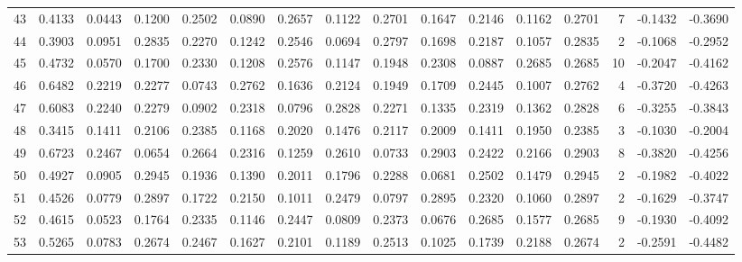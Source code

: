\begin{tabular}{lrrrrrrrrrrrrrrr}
43  &      0.4133 &  0.0443 &  0.1200 &  0.2502 &  0.0890 &  0.2657 &  0.1122 &  0.2701 &  0.1647 &  0.2146 &   0.1162 &     0.2701 &      7 &                   -0.1432 &                    -0.3690 \\
44  &      0.3903 &  0.0951 &  0.2835 &  0.2270 &  0.1242 &  0.2546 &  0.0694 &  0.2797 &  0.1698 &  0.2187 &   0.1057 &     0.2835 &      2 &                   -0.1068 &                    -0.2952 \\
45  &      0.4732 &  0.0570 &  0.1700 &  0.2330 &  0.1208 &  0.2576 &  0.1147 &  0.1948 &  0.2308 &  0.0887 &   0.2685 &     0.2685 &     10 &                   -0.2047 &                    -0.4162 \\
46  &      0.6482 &  0.2219 &  0.2277 &  0.0743 &  0.2762 &  0.1636 &  0.2124 &  0.1949 &  0.1709 &  0.2445 &   0.1007 &     0.2762 &      4 &                   -0.3720 &                    -0.4263 \\
47  &      0.6083 &  0.2240 &  0.2279 &  0.0902 &  0.2318 &  0.0796 &  0.2828 &  0.2271 &  0.1335 &  0.2319 &   0.1362 &     0.2828 &      6 &                   -0.3255 &                    -0.3843 \\
48  &      0.3415 &  0.1411 &  0.2106 &  0.2385 &  0.1168 &  0.2020 &  0.1476 &  0.2117 &  0.2009 &  0.1411 &   0.1950 &     0.2385 &      3 &                   -0.1030 &                    -0.2004 \\
49  &      0.6723 &  0.2467 &  0.0654 &  0.2664 &  0.2316 &  0.1259 &  0.2610 &  0.0733 &  0.2903 &  0.2422 &   0.2166 &     0.2903 &      8 &                   -0.3820 &                    -0.4256 \\
50  &      0.4927 &  0.0905 &  0.2945 &  0.1936 &  0.1390 &  0.2011 &  0.1796 &  0.2288 &  0.0681 &  0.2502 &   0.1479 &     0.2945 &      2 &                   -0.1982 &                    -0.4022 \\
51  &      0.4526 &  0.0779 &  0.2897 &  0.1722 &  0.2150 &  0.1011 &  0.2479 &  0.0797 &  0.2895 &  0.2320 &   0.1060 &     0.2897 &      2 &                   -0.1629 &                    -0.3747 \\
52  &      0.4615 &  0.0523 &  0.1764 &  0.2335 &  0.1146 &  0.2447 &  0.0809 &  0.2373 &  0.0676 &  0.2685 &   0.1577 &     0.2685 &      9 &                   -0.1930 &                    -0.4092 \\
53  &      0.5265 &  0.0783 &  0.2674 &  0.2467 &  0.1627 &  0.2101 &  0.1189 &  0.2513 &  0.1025 &  0.1739 &   0.2188 &     0.2674 &      2 &                   -0.2591 &                    -0.4482 \\

\end{tabular}
